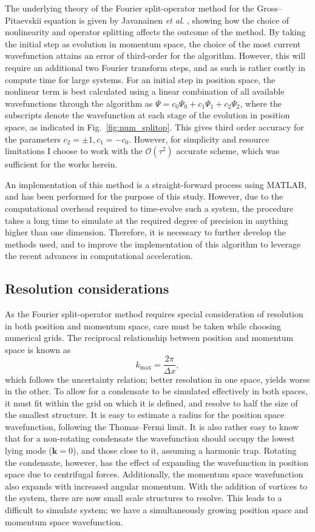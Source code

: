 The underlying theory of the Fourier split-operator method for the Gross--Pitaevskii equation is given by Javanainen \textit{et al}. \cite{BEC:Javanainen_jphysa_2006}, showing how the choice of nonlinearity and operator splitting affects the outcome of the method. By taking the initial step as evolution in momentum space, the choice of the most current wavefunction attains an error of third-order for the algorithm. However, this will require an additional two Fourier transform steps, and as such is rather costly in compute time for large systems. For an initial step in position space, the nonlinear term is best calculated using a linear combination of all available wavefunctions through the algorithm as $\Psi = c_0\Psi_0 + c_1\Psi_1 + c_2\Psi_2$, where the subscripts denote the wavefunction at each stage of the evolution in position space, as indicated in Fig.~\ref{fig:num_splitop}. This gives third order accuracy for the parameters $c_2=\pm 1, c_1=-c_0$. However, for simplicity and resource limitations I choose to work with the $\mathcal{O}\left(\tau^2\right)$ accurate scheme, which was sufficient for the works herein.

An implementation of this method is a straight-forward process using MATLAB, and has been performed for the purpose of this study. However, due to the computational overhead required to time-evolve such a system, the procedure takes a long time to simulate at the required degree of precision in anything higher than one dimension. Therefore, it is necessary to further develop the methods used, and to improve the implementation of this algorithm to leverage the recent advances in computational acceleration.

\subsection{Resolution considerations}
As the Fourier split-operator method requires special consideration of resolution in both position and momentum space, care must be taken while choosing numerical grids. The reciprocal relationship between position and momentum space is known as \begin{equation}
    k_{\text{max}} = \frac{2\pi}{\Delta x},
\end{equation}
which follows the uncertainty relation; better resolution in one space, yields worse in the other. To allow for a condensate to be simulated effectively in both spaces, it must fit within the grid on which it is defined, and resolve to half the size of the smallest structure. It is easy to estimate a radius for the position space wavefunction, following the Thomas--Fermi limit. It is also rather easy to know that for a non-rotating condensate the wavefunction should occupy the lowest lying mode ($\mathbf{k}=0$), and those close to it, assuming a harmonic trap. Rotating the condensate, however, has the effect of expanding the wavefunction in position space due to centrifugal forces. Additionally, the momentum space wavefunction also expands with increased angular momentum. With the addition of vortices to the system, there are now small scale structures to resolve. This leads to a difficult to simulate system; we have a simultaneously growing position space and momentum space wavefunction.

